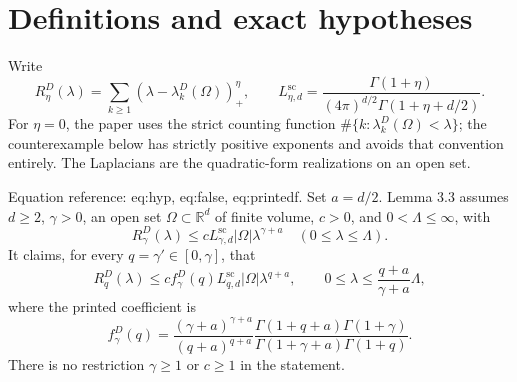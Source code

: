 \documentclass[10pt]{article}
\begin{document}
\section*{Definitions and exact hypotheses}
Write \[R_\eta^D(\lambda)
 =\sum_{k\geq1}(\lambda-\lambda_k^D(\Omega))_+^\eta,
 \qquad
 L^{\mathrm{sc}}_{\eta,d}
 =\frac{\Gamma(1+\eta)}
 {(4\pi)^{d/2}\Gamma(1+\eta+d/2)}.\] For \(\eta=0\), the paper uses the strict counting function \(\#\{k:\lambda_k^D(\Omega)<\lambda\}\); the counterexample below has strictly positive exponents and avoids that convention entirely. The Laplacians are the quadratic-form realizations on an open set.\par
Equation reference: eq:hyp, eq:false, eq:printedf. Set \(a=d/2\). Lemma 3.3 assumes \(d\geq2\), \(\gamma>0\), an open set \(\Omega\subset\mathbb R^d\) of finite volume, \(c>0\), and \(0<\Lambda\leq\infty\), with \[
 R_\gamma^D(\lambda)
 \leq cL^{\mathrm{sc}}_{\gamma,d}|\Omega|\lambda^{\gamma+a}
 \quad(0\leq\lambda\leq\Lambda).\] It claims, for every \(q=\gamma'\in[0,\gamma]\), that \[
 R_q^D(\lambda)
 \leq c f_\gamma^D(q)L^{\mathrm{sc}}_{q,d}|\Omega|\lambda^{q+a},
 \qquad
 0\leq\lambda\leq\frac{q+a}{\gamma+a}\Lambda,\] where the printed coefficient is \[
 f_\gamma^D(q)=
 \frac{(\gamma+a)^{\gamma+a}}{(q+a)^{q+a}}
 \frac{\Gamma(1+q+a)\Gamma(1+\gamma)}
 {\Gamma(1+\gamma+a)\Gamma(1+q)}.\] There is no restriction \(\gamma\geq1\) or \(c\geq1\) in the statement.\par
\end{document}
